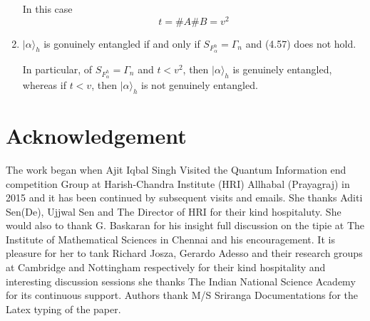 \documentclass[a4paper,12pt]{article}
\theoremstyle{definition}
\theoremstyle{underlinethm}
\theoremstyle{definition}
\begin{document}
\begin{enumerate}[label=(\alph*)]
In this case
\begin{equation}
t = \# A \# B =v^{2} \tag{4.58}\label{eq-4.58}
\end{equation}

\item $| \alpha \rangle_{h}$ is gonuinely entangled if and only if $S_{F_{\alpha}^{h}} = \Gamma_{n}$ and (4.57) does not hold. 

In particular, of $S_{F_{\alpha}^{h}} = \Gamma_{n}$ and $t < v^{2}$, then $| \alpha \rangle_{h}$ is genuinely entangled, whereas if $t < v$, then $| \alpha \rangle_{h}$ is not genuinely entangled.
\end{enumerate}


\section{Acknowledgement}

The work began when Ajit Iqbal Singh Visited the Quantum Information end competition Group at Harish-Chandra Institute (HRI) Allhabal (Prayagraj) in 2015 and it has been continued by subsequent visits and emails. She thanks Aditi Sen(De), Ujjwal Sen and The Director of HRI for their kind hospitaluty. She would also to thank G. Baskaran for his insight full discussion on the tipie at The Institute of Mathematical Sciences in  Chennai and his encouragement. It is pleasure for her to tank Richard Josza, Gerardo Adesso and their research groups at Cambridge and Nottingham respectively for their kind hospitality and interesting discussion sessions she thanks The Indian National Science Academy for its continuous support. Authors thank M/S Sriranga Documentations for the Latex typing of the paper. 
\end{document}
